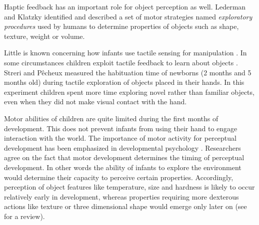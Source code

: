 Haptic feedback has an important role for object perception as
well. Lederman and Klatzky \cite{lederman87hand} identified and
described a set of motor strategies named \emph{exploratory
procedures} used by humans to determine properties of objects such
as shape, texture, weight or volume.

Little is known concerning how infants use tactile sensing for
manipulation \cite{streri93Seeing}.
In some circumstances children exploit tactile feedback to learn
about objects \cite{streri86Habituation}. Streri and P\^{e}cheux
measured the habituation time of newborns (2 months and 5 months
old) during tactile exploration of objects placed in their hands.
In this experiment children spent more time exploring novel rather
than familiar objects, even when they did not make visual contact
with the hand. %

Motor abilities of children are quite limited during the first
months of development. This does not prevent infants from using
their hand to engage interaction with the world. The importance of
motor activity for perceptual development has been emphasized in
developmental psychology \cite{hofsten04motor,gibson88explore}.
Researchers agree on the fact that motor development determines
the timing of perceptual development. In other words the ability
of infants to explore the environment would determine their
capacity to perceive certain properties. Accordingly, perception
of object features like temperature, size and hardness is likely
to occur relatively early in development, whereas properties
requiring more dexterous actions like texture or three dimensional
shape would emerge only later on (see \cite{bushnell93motor} for a
review).

%

